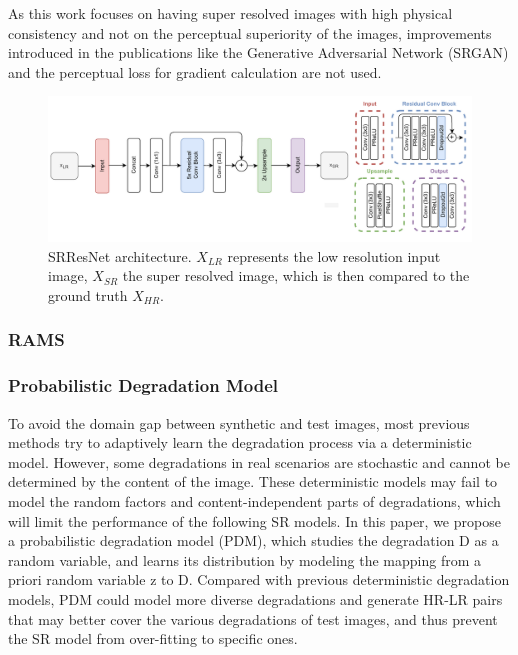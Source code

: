             As this work focuses on having super resolved images with high physical consistency and not on the perceptual superiority of the images, improvements introduced in the publications like the Generative Adversarial Network (SRGAN)  and the perceptual loss for gradient calculation are not used.
        

            \begin{figure}[h!]
                \centering
                \includegraphics[width=1\textwidth]{includes/3-srresnet-architecture.pdf}
                \caption{ SRResNet architecture. $X_{LR}$ represents the low resolution input image, $X_{SR}$ the super resolved image, which is then compared to the ground truth $X_{HR}$.}
                \label{fig:generator}
             \end{figure}

        \subsubsection{RAMS}
        \subsubsection{Probabilistic Degradation Model}

            To avoid the domain gap between synthetic and test images, most previous methods try to adaptively learn the degradation process via a deterministic model.
            However, some degradations in real scenarios are stochastic and cannot be determined by the content of the image.
            These deterministic models may fail to model the random factors and content-independent parts of degradations, which will limit the performance of the following SR models.
            In this paper, we propose a probabilistic degradation model (PDM), which studies the degradation D as a random variable, and learns its distribution by modeling the mapping from a priori random variable z to D.
            Compared with previous deterministic degradation models, PDM could model more diverse degradations and generate HR-LR pairs that may better cover the various degradations of test images, and thus prevent the SR model from over-fitting to specific ones.


